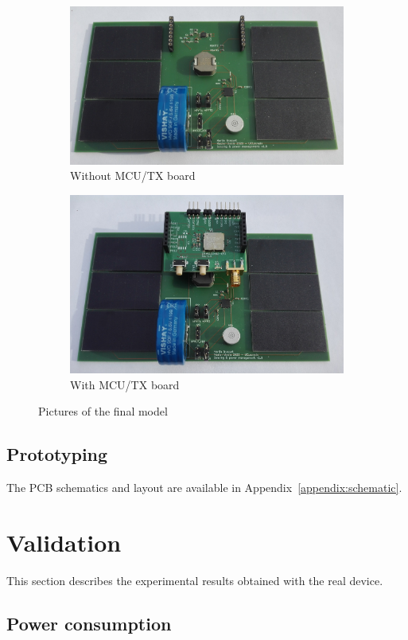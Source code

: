 \documentclass{EPL-master-thesis-covers-EN}
\begin{document}
\begin{figure}[H]
\begin{subfigure}{.5\textwidth}
  \centering
  \includegraphics[width=.52\linewidth,angle=90]{img/real_PCB.jpg}  
  \caption{Without MCU/TX board}
\end{subfigure}
\begin{subfigure}{.48\textwidth}
  \centering
  \includegraphics[width=.82\linewidth]{img/real_PCB_with_MCU.jpg}  
  \caption{With MCU/TX board}
\end{subfigure}
\caption{Pictures of the final model}
\label{fig:final_model_picture}
\end{figure}

\subsection*{Prototyping}

The PCB schematics and layout are available in Appendix~\ref{appendix:schematic}.

\section{Validation}

This section describes the experimental results obtained with the real device.

\subsection*{Power consumption}
\end{document}
